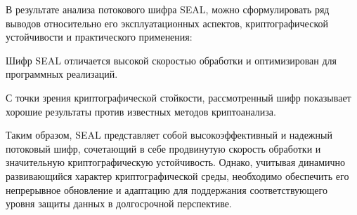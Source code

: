 \documentclass[colorthm]{../civarticle}
\begin{document}
В результате анализа потокового шифра SEAL, можно сформулировать ряд выводов относительно его эксплуатационных аспектов, криптографической устойчивости и практического применения: 

Шифр SEAL отличается высокой скоростью обработки и оптимизирован для программных реализаций.

С точки зрения криптографической стойкости, рассмотренный шифр показывает хорошие результаты против известных методов криптоанализа. 

Таким образом, SEAL представляет собой высокоэффективный и надежный потоковый шифр, сочетающий в себе продвинутую скорость обработки и значительную криптографическую устойчивость. Однако, учитывая динамично развивающийся характер криптографической среды, необходимо обеспечить его непрерывное обновление и адаптацию для поддержания соответствующего уровня защиты данных в долгосрочной перспективе.


\label{sec:minted}
\if \MINTED\empty
\else \inputminted{python}{code.py} \fi
\end{document}

